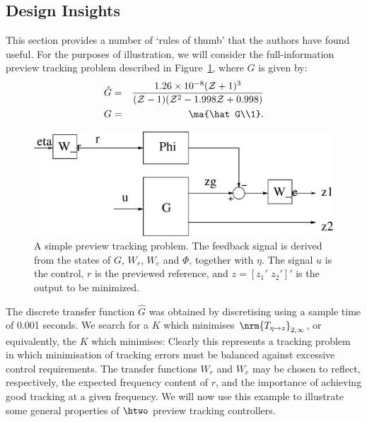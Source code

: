 \subsection{Design Insights}
This section provides a number of `rules of thumb' that the authors have found useful. For the purposes of illustration, we will consider the full-information preview tracking problem described in Figure~\ref{fig:PrevTrackSysFI}, where $G$ is given by:
\begin{eqnarray}
\hat G&=&\frac{1.26 \times 10^{-8} (\z+1)^3}{
		(\z-1) (\z^2  - 1.998\z + 0.998)} \nonumber \\
G&=&\ma{\hat G\\1}. \label{example}
\end{eqnarray}
\begin{figure}
\begin{center}
\includegraphics[width=0.75\columnwidth]{./diags/PrevTrackSysFI.eps}
\end{center}
\caption{A simple preview tracking problem. The feedback signal is derived from the states of $G$, $W_r$, $W_e$ and $\Phi$, together with $\eta$. The signal $u$ is the control, $r$ is the previewed reference, and $z=\left[z_1'\,\,z_2'\right]'$ is the output to be minimized. \label{fig:PrevTrackSysFI}}
\end{figure}
The discrete transfer function $\hat G$ was obtained by discretising
using a sample time of 0.001 seconds.
We search for a $K$ which minimises $\nrm{T_{\eta\rightarrow z}}_{2,\infty}$, or equivalently, the $K$ which minimises:
Clearly this represents a tracking problem in which minimisation of tracking errors must be balanced against  excessive control requirements. The transfer functions $W_r$ and $W_e$ may be chosen to reflect, respectively, the expected frequency content of $r$, and the importance of achieving good tracking at a given frequency. We will now use this example to illustrate some general properties of $\htwo$ preview tracking controllers.

